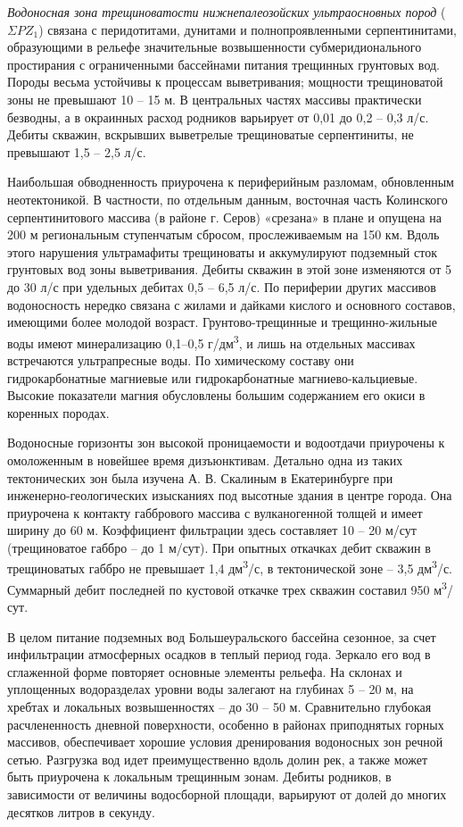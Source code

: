\documentclass[a4paper,12pt]{article} %
\begin{document}
\textit{Водоносная зона трещиноватости нижнепалеозойских ультраосновных пород} ($\Sigma PZ_1$)
связана с перидотитами, дунитами и полнопроявленными серпентинитами, образующими в рельефе значительные возвышенности субмеридионального простирания с ограниченными бассейнами питания трещинных грунтовых вод. Породы весьма устойчивы к процессам выветривания; мощности трещиноватой зоны не превышают 10 – 15 м. В центральных частях массивы практически безводны, а в окраинных расход родников варьирует от 0,01 до 0,2 – 0,3 л/с. Дебиты скважин, вскрывших выветрелые трещиноватые серпентиниты, не превышают 1,5 – 2,5 л/с.

Наибольшая обводненность приурочена к периферийным разломам, обновленным неотектоникой. В частности, по отдельным данным, восточная часть Колинского серпентинитового массива (в районе г. Серов) «срезана» в плане и опущена на 200 м региональным ступенчатым сбросом, прослеживаемым на 150 км. Вдоль этого нарушения ультрамафиты трещиноваты и аккумулируют подземный сток грунтовых вод зоны выветривания. Дебиты скважин в этой зоне изменяются от 5 до 30 л/с при удельных дебитах 0,5 – 6,5 л/с. По периферии других массивов водоносность нередко связана с жилами и дайками кислого и основного составов, имеющими более молодой возраст. Грунтово-трещинные и трещинно-жильные воды имеют минерализацию 0,1–0,5 г/дм\textsuperscript{3}, и лишь на отдельных массивах встречаются ультрапресные воды. По химическому составу они гидрокарбонатные магниевые или гидрокарбонатные магниево-кальциевые. Высокие показатели магния обусловлены большим содержанием его окиси в коренных породах.

Водоносные горизонты зон высокой проницаемости и водоотдачи приурочены к омоложенным в новейшее время дизъюнктивам. Детально одна из таких тектонических зон была изучена А. В. Скалиным в Екатеринбурге
при инженерно-геологических изысканиях под высотные здания в центре города. Она приурочена к контакту габбрового массива с вулканогенной толщей и имеет ширину до 60 м. Коэффициент фильтрации здесь составляет 10 – 20 м/сут (трещиноватое габбро – до 1 м/сут). При опытных откачках дебит скважин в трещиноватых габбро не превышает 1,4 дм\textsuperscript{3}/с, в тектонической зоне – 3,5 дм\textsuperscript{3}/с. Суммарный дебит последней по кустовой откачке трех скважин составил 950 м\textsuperscript{3}/сут.

В целом питание подземных вод Большеуральского бассейна сезонное, за счет инфильтрации атмосферных осадков в теплый период года. Зеркало его вод в сглаженной форме повторяет основные элементы рельефа. На склонах и уплощенных водоразделах уровни воды залегают на глубинах 5 – 20 м, на хребтах и локальных возвышенностях – до 30 – 50 м. Сравнительно глубокая расчлененность дневной поверхности, особенно в районах приподнятых горных массивов, обеспечивает хорошие условия дренирования водоносных зон речной сетью. Разгрузка вод идет преимущественно вдоль долин рек, а также может быть приурочена к локальным трещинным зонам. Дебиты родников, в зависимости от величины водосборной площади, варьируют от долей до многих десятков литров в секунду.
\end{document}
